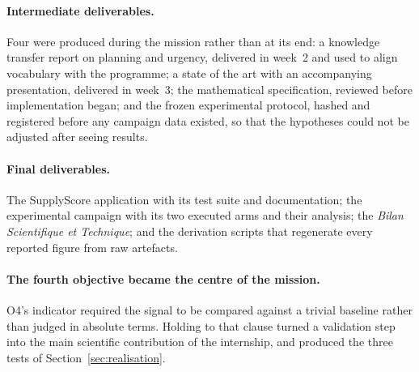 \paragraph{Intermediate deliverables.}
Four were produced during the mission rather than at its end: a knowledge transfer report on
planning and urgency, delivered in week~2 and used to align vocabulary with the programme; a
state of the art with an accompanying presentation, delivered in week~3; the mathematical
specification, reviewed before implementation began; and the frozen experimental protocol,
hashed and registered before any campaign data existed, so that the hypotheses could not be
adjusted after seeing results.

\paragraph{Final deliverables.}
The SupplyScore application with its test suite and documentation; the experimental campaign
with its two executed arms and their analysis; the \emph{Bilan Scientifique et Technique};
and the derivation scripts that regenerate every reported figure from raw artefacts.

\paragraph{The fourth objective became the centre of the mission.}
O4's indicator required the signal to be compared against a trivial baseline rather than judged
in absolute terms. Holding to that clause turned a validation step into the main scientific
contribution of the internship, and produced the three tests of
Section~\ref{sec:realisation}.

